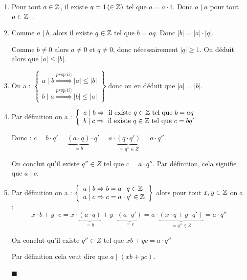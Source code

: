 \medskip
{}

\vspace{-2mm}
\begin{enumerate}[label=\roman*),itemsep=4mm]
\item Pour tout $a\in \mathbb{Z}$, il existe $q=1\,(\in \mathbb{Z})$ tel que $a=a\cdot 1$. Donc  $a\mid a$ pour tout $a\in\mathbb{Z}$ . 
\item Comme $a\mid b$, alors il existe $q\in\mathbb{Z}$ tel que $b=aq$. Donc $|b|=|a|\cdot |q|$.

Comme $b\neq 0$ alors $a\neq 0$ et $q\neq 0$, donc nécessairement $|q|\geqslant 1$. On déduit alors que $|a|\leqslant|b|$.
\item On a : \renewcommand{\arraystretch}{1.5}
$\left\lbrace\begin{array}{l}
a\mid b \overset{\scriptscriptstyle{prop. ii)}}{\Rightarrow} |a|\leqslant |b|\\
b\mid a \overset{\scriptscriptstyle{prop. ii)}}{\Rightarrow} |b|\leqslant |a|
\end{array}\right\rbrace$ donc on en déduit que $|a|= |b|$.
\item Par définition on a : \renewcommand{\arraystretch}{1.5}
$\left\lbrace\begin{array}{l}
a\mid b \Rightarrow \textrm{ il existe } q\in\mathbb{Z}\textrm{ tel que } b=aq\\
b\mid c \Rightarrow \textrm{ il existe } q\in\mathbb{Z}\textrm{ tel que } c=bq'
\end{array}\right.$

Donc : $c=b\cdot q'=\underbrace{(a\cdot q)}_{=b}\cdot q'=a\cdot \underbrace{(q\cdot q')}_{=q''\in Z}=a\cdot q''$.

\smallskip
On conclut qu'il existe $q''\in Z$ tel que $c=a\cdot q''$. Par définition, cela signifie que $a\mid c$. 
\item Par définition on a : \renewcommand{\arraystretch}{1.5}
$\left\lbrace\begin{array}{l}
a\mid b \Rightarrow b=a\cdot q\in \mathbb{Z}\\
a\mid c \Rightarrow c=a\cdot q'\in \mathbb{Z}
\end{array}\right\rbrace$ alors pour tout $x, y \in \mathbb{Z}$ on a :
$$x\cdot b+y\cdot c=x\cdot\underbrace{(a\cdot q)}_{=b}+y\cdot\underbrace{(a\cdot q')}_{=c}=a\cdot\underbrace{(x\cdot q+y\cdot q')}_{=q''\in Z}=a\cdot q''$$

\smallskip
On conclut qu'il existe $q''\in Z$ tel que $xb+yc=a\cdot q''$

\smallskip
Par définition cela veut dire que $a\mid (xb+yc)$.

\hfill $\blacksquare$
\end{enumerate}

